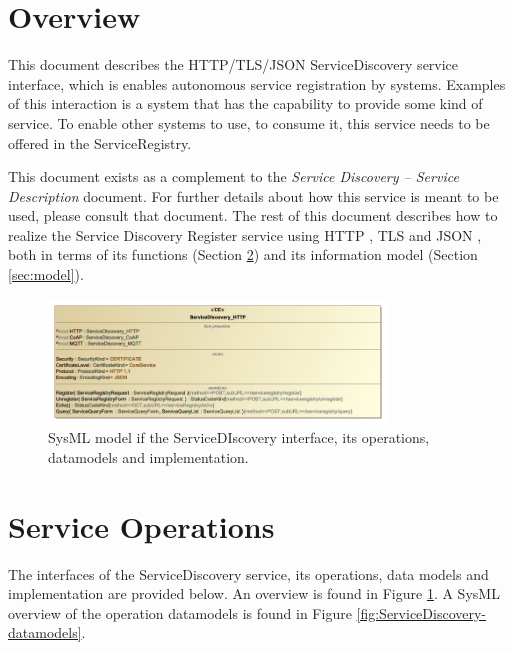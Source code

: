 \documentclass[a4paper]{arrowhead}
\begin{document}
\section{Overview}
\label{sec:overview}

This document describes the HTTP/TLS/JSON ServiceDiscovery service interface, which is enables autonomous service registration by systems.
Examples of this interaction is a system that has the capability to provide some kind of service. To enable other systems to use, to consume it, this service needs to be offered in the ServiceRegistry.

This document exists as a complement to the \textit{Service Discovery -- Service Description} document.
For further details about how this service is meant to be used, please consult that document.
The rest of this document describes how to realize the Service Discovery Register service using HTTP \cite{fielding2014hypertext}, TLS \cite{rescorla2018transport} and JSON \cite{bray2014json}, both in terms of its functions (Section \ref{sec:functions}) and its information model (Section \ref{sec:model}).

\newpage

\begin{figure}[ht!]
  \centering
  \includegraphics[width=0.8\textwidth]{figures/ServiceDiscovery-IDD}
  \caption{SysML model if the ServiceDIscovery interface, its
    operations, datamodels and implementation.}
  \label{fig:ServiceDiscovery-IDD}
\end{figure}



\section{Service Operations}
\label{sec:functions}

The interfaces of the ServiceDiscovery service, its operations, data models and implementation are provided below. An overview is found in Figure \ref{fig:ServiceDiscovery-IDD}. A SysML overview of the operation datamodels is found in Figure \ref{fig:ServiceDiscovery-datamodels}.
\end{document}
